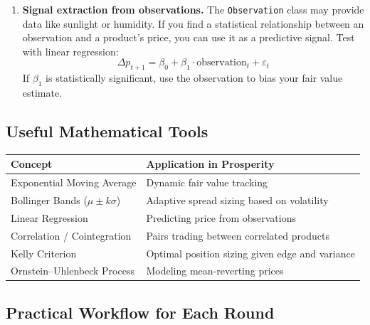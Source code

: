 \documentclass[11pt, letterpaper]{article}
\begin{document}
\begin{enumerate}
    \item \textbf{Signal extraction from observations.} The \texttt{Observation} class may provide data like sunlight or humidity. If you find a statistical relationship between an observation and a product's price, you can use it as a predictive signal. Test with linear regression:
    \begin{equation}
        \Delta p_{t+1} = \beta_0 + \beta_1 \cdot \text{observation}_t + \varepsilon_t
    \end{equation}
    If $\beta_1$ is statistically significant, use the observation to bias your fair value estimate.

\end{enumerate}

\subsection{Useful Mathematical Tools}

\begin{center}
\begin{tabular}{lp{7cm}}
\toprule
\textbf{Concept} & \textbf{Application in Prosperity} \\
\midrule
Exponential Moving Average & Dynamic fair value tracking \\
Bollinger Bands ($\mu \pm k\sigma$) & Adaptive spread sizing based on volatility \\
Linear Regression & Predicting price from observations \\
Correlation / Cointegration & Pairs trading between correlated products \\
Kelly Criterion & Optimal position sizing given edge and variance \\
Ornstein--Uhlenbeck Process & Modeling mean-reverting prices \\
\bottomrule
\end{tabular}
\end{center}

\subsection{Practical Workflow for Each Round}
\end{document}
